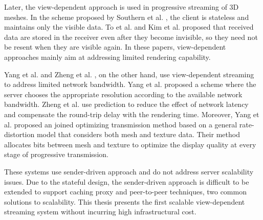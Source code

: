    Later, the view-dependent approach is used in progressive 
	streaming of 3D meshes.     
    In the scheme proposed by Southern et al. \cite{363375},  the client is stateless and
    maintains only the visible data. 
    To et al. \cite{To1999}
    and Kim et al. \cite{kim:view} proposed that received data are stored
    in the receiver even after they become invisible, 
    so they need not be resent when they are visible again. 
    In these papers, view-dependent approaches mainly aim at addressing
    limited rendering capability. 
    
    Yang et al. \cite{progressive:Yang} and
    Zheng et al. \cite{zheng:interactive}, on the other hand, use
    view-dependent streaming to address limited network bandwidth.
    Yang et al. proposed a scheme where the server chooses the appropriate resolution
    according to the available network bandwidth.
    Zheng et al. \cite{zheng:interactive} use prediction to
    reduce the effect of network latency and 
    compensate the round-trip delay with the rendering time.
    Moreover, Yang et al. \cite{optimized:yang} proposed an joined 
    optimizing transmission method based on a general rate-distortion
    model that considers both mesh and texture data. Their method
    allocates bits between mesh and texture to optimize the display 
    quality at every stage of progressive transmission.
     
    These systems use sender-driven approach and do not address
    server scalability issues. Due to the stateful design, 
    the sender-driven approach is difficult to be extended to
    support caching proxy and peer-to-peer techniques, two 
    common solutions to scalability. This thesis presents the first
    scalable 
    view-dependent streaming system without incurring high infrastructural cost.
    

